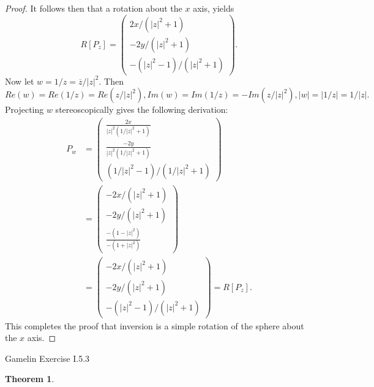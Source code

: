 \documentclass[letter]{article}
\newtheorem{theorem}{Theorem}
\newenvironment{menumerate}{%
  \edef\backupindent{\the\parindent}%
  \enumerate%
  \setlength{\parindent}{\backupindent}%
}{\endenumerate}
\begin{document}
\begin{menumerate}
\begin{proof}
         It follows then that a rotation about the $x$ axis, yields 
         \begin{equation}
         R[P_z] = \left(
        \begin{array}{c}
        2x/(|z|^2 +1)\\
        -2y/(|z|^2+1)\\
        -(|z|^2 -1)/(|z|^2 + 1)
        \end{array}
        \right).
         \end{equation} 
         Now let $w = 1/z = \overline{z}/|z|^2.$ Then $Re(w) = Re(1/z) = Re(z/|z|^2), Im(w) = Im(1/z) = -Im(z/|z|^2), |w| = |1/z| = 1/|z|.$
         Projecting $w$ stereoscopically gives the following derivation: 
         \begin{equation}
         \begin{aligned}
                         P_w &= \left(
                 \begin{array}{c}
                 \frac{2x}{|z|^2(1/|z|^2 +1)}\\
                 \frac{-2y}{|z|^2(1/|z|^2+1)}\\
                 (1/|z|^2 -1)/(1/|z|^2 + 1)
                 \end{array}
                 \right) \\
                 &= 
                 \left(
                 \begin{array}{c}
                 -2x/(|z|^2 +1)\\
                -2y/(|z|^2+1)\\
                 \frac{-(1-|z|^2)}{-(1 +|z|^2)}
                 \end{array}
                 \right) \\
                 &= \left(
                \begin{array}{c}
                -2x/(|z|^2 +1)\\
                -2y/(|z|^2+1)\\
                -(|z|^2 -1)/(|z|^2 + 1)
                \end{array}
                \right) = R[P_z].
            \end{aligned}
         \end{equation}
         This completes the proof that inversion is a simple rotation of the sphere about the $x$ axis.
    \end{proof}
    \item Gamelin Exercise I.5.3
    \begin{theorem}

\end{theorem}
\end{menumerate}
\end{document}
